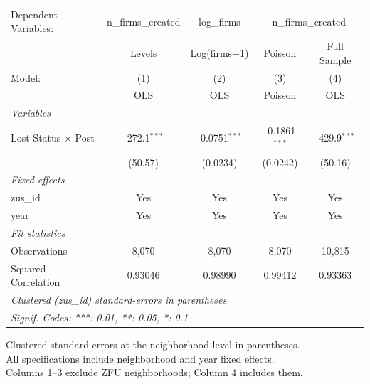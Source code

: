 
\begingroup
\centering
\begin{tabular}{lcccc}
   \tabularnewline \midrule \midrule
   Dependent Variables: & n\_firms\_created & log\_firms & \multicolumn{2}{c}{n\_firms\_created}\\
                              & Levels         & Log(firms+1)    & Poisson         & Full Sample \\   
   Model:                     & (1)            & (2)             & (3)             & (4)\\  
                              &  OLS           & OLS             & Poisson         & OLS\\  
   \midrule
   \emph{Variables}\\
   Lost Status $\times$ Post  & -272.1$^{***}$ & -0.0751$^{***}$ & -0.1861$^{***}$ & -429.9$^{***}$\\   
                              & (50.57)        & (0.0234)        & (0.0242)        & (50.16)\\   
   \midrule
   \emph{Fixed-effects}\\
   zus\_id                    & Yes            & Yes             & Yes             & Yes\\  
   year                       & Yes            & Yes             & Yes             & Yes\\  
   \midrule
   \emph{Fit statistics}\\
   Observations               & 8,070          & 8,070           & 8,070           & 10,815\\  
   Squared Correlation        & 0.93046        & 0.98990         & 0.99412         & 0.93363\\  
   \midrule \midrule
   \multicolumn{5}{l}{\emph{Clustered (zus\_id) standard-errors in parentheses}}\\
   \multicolumn{5}{l}{\emph{Signif. Codes: ***: 0.01, **: 0.05, *: 0.1}}\\
\end{tabular}
 
\par \raggedright 
Clustered standard errors at the neighborhood level in parentheses.\\
All specifications include neighborhood and year fixed effects.\\
Columns 1--3 exclude ZFU neighborhoods; Column 4 includes them.
\par\endgroup


